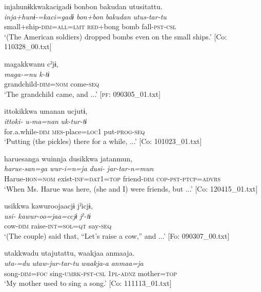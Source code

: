 \ex \label{ex:7:25c}{\TM}
\glll  injahunɨkkwakacigadɨ  {\textbar}bonbon  bakudan  utusi{\textbar}tattu.\\
\textit{inja+hunɨ-=kaci=gadɨ}  \textit{bon+bon}  \textit{bakudan}  \textit{utus-tar-tu}\\
small+ship-\textsc{dim}=\textsc{all}=\textsc{lmt}  \textsc{red}+bong  bomb  fall-\textsc{pst}-\textsc{csl}\\
\glt ‘(The American soldiers) dropped bombs even on the small ships.’ [Co: 110328\_00.txt]

\ex \label{ex:7:25d}{\TM}
\glll  magakkwanu  cˀjɨ,\\
\textit{maga{}-=nu  k-tɨ}\\
grandchild-\textsc{dim}=\textsc{nom}  come-\textsc{seq}\\
\glt ‘The grandchild came, and ...’ [\textsc{pf}: 090305\_01.txt]

\ex \label{ex:7:25e}{\TM}
\glll  {\textbar}ittoki{\textbar}kkwa  umanan  ucjutɨ,\\
\textit{ittoki-}  \textit{u-ma=nan}  \textit{uk-tur-tɨ}\\
for.a.while-\textsc{dim}  \textsc{mes}-place=\textsc{loc}1  put-\textsc{prog}-\textsc{seq}\\
\glt ‘Putting (the pickles) there for a while, ...’ [Co: 101023\_01.txt]

\ex \label{ex:7:25f}
 {\TM}
\glll  haruesanga  wuinnja  dusikkwa  jatanmun,\\
\textit{harue-san=ga}  \textit{wur-i=n=ja}  \textit{dusi-}  \textit{jar-tar-n=mun}\\
Harue-\textsc{hon}=\textsc{nom}  exist{}-\textsc{inf}=\textsc{dat}1=\textsc{top}  friend-\textsc{dim}  \textsc{cop}-\textsc{pst}-\textsc{ptcp}=\textsc{advrs}\\
\glt ‘When Ms. Harue was here, (she and I) were friends, but ...’ [Co: 120415\_01.txt]

\ex \label{ex:7:25g}{\TM}
\glll  usikkwa  kawuroojaacjɨ  jˀicjɨ,\\
\textit{usi-}  \textit{kawur-oo=jaa=ccjɨ}  \textit{jˀ-tɨ}\\
cow-\textsc{dim}  raise-\textsc{int}=\textsc{sol}=\textsc{qt}  say-\textsc{seq}\\
\glt ‘(The couple) said that, “Let’s raise a cow,” and ...’ [Fo: 090307\_00.txt]

\ex \label{ex:7:25h} {\TM}
\glll  utakkwadu  utajutattu,  waakjaa  anmaaja.\\
\textit{uta-=du}  \textit{utaw-jur-tar-tu}  \textit{waakja-a}  \textit{anmaa=ja}\\
song-\textsc{dim}=\textsc{foc}  sing-\textsc{umrk}-\textsc{pst}-\textsc{csl}  1\textsc{pl}-\textsc{adnz}  mother=\textsc{top}\\
\glt ‘My mother used to sing a song.’ [Co: 111113\_01.txt]

